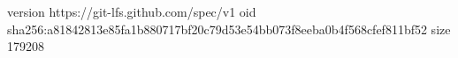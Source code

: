version https://git-lfs.github.com/spec/v1
oid sha256:a81842813e85fa1b880717bf20c79d53e54bb073f8eeba0b4f568cfef811bf52
size 179208
